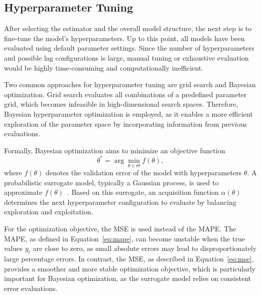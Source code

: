 \subsection{Hyperparameter Tuning}
\label{subsec:tuning}
After selecting the estimator and the overall model structure, the next step is to fine-tune the model’s hyperparameters. Up to this point, all models have been evaluated using default parameter settings. Since the number of hyperparameters and possible lag configurations is large, manual tuning or exhaustive evaluation would be highly time-consuming and computationally inefficient.

Two common approaches for hyperparameter tuning are grid search and Bayesian optimization. Grid search evaluates all combinations of a predefined parameter grid, which becomes infeasible in high-dimensional search spaces. Therefore, Bayesian hyperparameter optimization is employed, as it enables a more efficient exploration of the parameter space by incorporating information from previous evaluations.

Formally, Bayesian optimization aims to minimize an objective function
\begin{equation}
    \theta^* = \arg\min_{\theta \in \Theta} f(\theta),
\end{equation}
where $f(\theta)$ denotes the validation error of the model with hyperparameters $\theta$. A probabilistic surrogate model, typically a Gaussian process, is used to approximate $f(\theta)$~\cite{rasmussen_2006_gaussian}. Based on this surrogate, an acquisition function $\alpha(\theta)$ determines the next hyperparameter configuration to evaluate by balancing exploration and exploitation.

For the optimization objective, the \ac{MSE} is used instead of the \ac{MAPE}. The \ac{MAPE}, as defined in Equation~\ref{eq:mape}, can become unstable when the true values $y_t$ are close to zero, as small absolute errors may lead to disproportionately large percentage errors. In contrast, the \ac{MSE}, as described in Equation~\ref{eq:mse}, provides a smoother and more stable optimization objective, which is particularly important for Bayesian optimization, as the surrogate model relies on consistent error evaluations.

